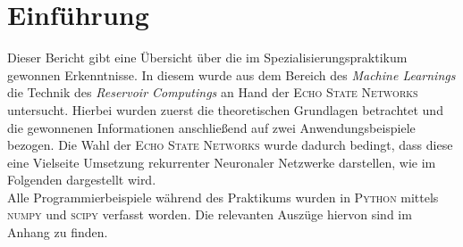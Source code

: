 \chapter{Einführung}
Dieser Bericht gibt eine Übersicht über die im Spezialisierungspraktikum gewonnen Erkenntnisse. In diesem wurde aus dem Bereich des \textit{Machine Learnings} die Technik des \textit{Reservoir Computings} an Hand der \textsc{Echo State Networks} untersucht. Hierbei wurden zuerst die theoretischen Grundlagen betrachtet und die gewonnenen Informationen anschließend auf zwei Anwendungsbeispiele bezogen. Die Wahl der \textsc{Echo State Networks} wurde dadurch bedingt, dass diese eine Vielseite Umsetzung rekurrenter Neuronaler Netzwerke darstellen, wie im Folgenden dargestellt wird.\\
Alle Programmierbeispiele während des Praktikums wurden in \textsc{Python} mittels \textsc{numpy} und \textsc{scipy} verfasst worden. Die relevanten Auszüge hiervon sind im Anhang zu finden.